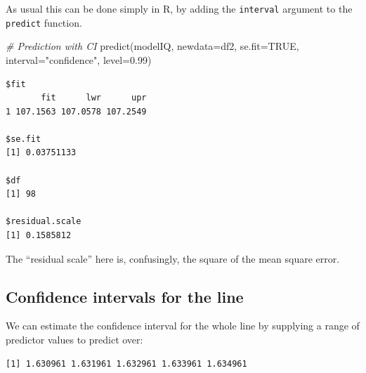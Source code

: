 \documentclass[
  oneside]{krantz}
\newenvironment{Shaded}{\begin{snugshade}}{\end{snugshade}}
\newcommand{\AttributeTok}[1]{\textcolor[rgb]{0.77,0.63,0.00}{#1}}
\newcommand{\CommentTok}[1]{\textcolor[rgb]{0.56,0.35,0.01}{\textit{#1}}}
\newcommand{\ConstantTok}[1]{\textcolor[rgb]{0.00,0.00,0.00}{#1}}
\newcommand{\DecValTok}[1]{\textcolor[rgb]{0.00,0.00,0.81}{#1}}
\newcommand{\FloatTok}[1]{\textcolor[rgb]{0.00,0.00,0.81}{#1}}
\newcommand{\FunctionTok}[1]{\textcolor[rgb]{0.00,0.00,0.00}{#1}}
\newcommand{\NormalTok}[1]{#1}
\newcommand{\OtherTok}[1]{\textcolor[rgb]{0.56,0.35,0.01}{#1}}
\newcommand{\SpecialCharTok}[1]{\textcolor[rgb]{0.00,0.00,0.00}{#1}}
\newcommand{\StringTok}[1]{\textcolor[rgb]{0.31,0.60,0.02}{#1}}
\begin{document}
As usual this can be done simply in R, by adding the \texttt{interval} argument to the \texttt{predict} function.

\begin{Shaded}
\begin{Highlighting}[]
\CommentTok{\# Prediction with CI }
\FunctionTok{predict}\NormalTok{(modelIQ, }\AttributeTok{newdata=}\NormalTok{df2, }\AttributeTok{se.fit=}\ConstantTok{TRUE}\NormalTok{, }\AttributeTok{interval=}\StringTok{"confidence"}\NormalTok{, }
        \AttributeTok{level=}\FloatTok{0.99}\NormalTok{)}
\end{Highlighting}
\end{Shaded}

\begin{verbatim}
$fit
       fit      lwr      upr
1 107.1563 107.0578 107.2549

$se.fit
[1] 0.03751133

$df
[1] 98

$residual.scale
[1] 0.1585812
\end{verbatim}

The ``residual scale'' here is, confusingly, the square of the mean square error.

\hypertarget{confidence-intervals-for-the-line}{%
\subsection{Confidence intervals for the line}\label{confidence-intervals-for-the-line}}

We can estimate the confidence interval for the whole line by supplying a range of predictor values to predict over:

\begin{Shaded}
\end{Shaded}

\begin{verbatim}
[1] 1.630961 1.631961 1.632961 1.633961 1.634961
\end{verbatim}
\end{document}

